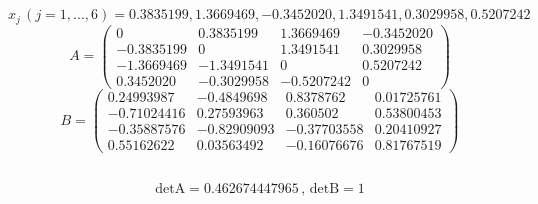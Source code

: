 \documentclass{jsarticle}
\begin{document}
\subsection{}
$x_{j}\,(j=1,...,6) = 0.3835199,  1.3669469, -0.3452020,  1.3491541,  0.3029958,  0.5207242$\\
\[
  A	= \left(
    \begin{array}{cccc}
      0	         & 0.3835199  & 1.3669469  & -0.3452020\\
      -0.3835199 & 0          & 1.3491541  & 0.3029958\\
      -1.3669469 & -1.3491541 & 0          & 0.5207242\\
      0.3452020  & -0.3029958 & -0.5207242 & 0
    \end{array}
  \right)
\]
\[
  B	= \left(
    \begin{array}{cccc}
      0.24993987  & -0.4849698  & 0.8378762   & 0.01725761\\
      -0.71024416 & 0.27593963  & 0.360502    & 0.53800453\\
      -0.35887576 & -0.82909093 & -0.37703558 & 0.20410927\\
      0.55162622  & 0.03563492  & -0.16076676 & 0.81767519
    \end{array}
  \right)
\]

\subsection{}
\[\mathrm{detA} = 0.462674447965\, , \, \mathrm{detB} = 1\]
\end{document}

